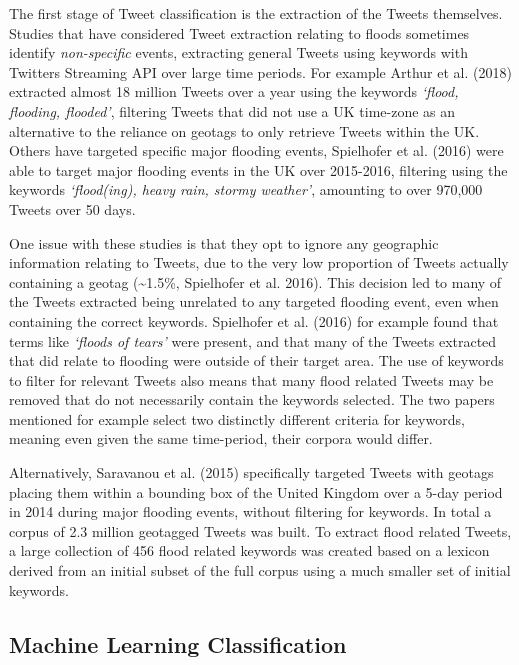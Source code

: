 \documentclass[a4paper, notitlepage]{extreport}
\begin{document}
The first stage of Tweet classification is the extraction of the Tweets
themselves. Studies that have considered Tweet extraction relating to
floods sometimes identify \emph{non-specific} events, extracting general
Tweets using keywords with Twitters Streaming API over large time
periods. For example Arthur et al. (2018) extracted almost 18 million
Tweets over a year using the keywords \emph{`flood, flooding, flooded'},
filtering Tweets that did not use a UK time-zone as an alternative to
the reliance on geotags to only retrieve Tweets within the UK. Others
have targeted specific major flooding events, Spielhofer et al. (2016)
were able to target major flooding events in the UK over 2015-2016,
filtering using the keywords \emph{`flood(ing), heavy rain, stormy
weather'}, amounting to over 970,000 Tweets over 50 days.

One issue with these studies is that they opt to ignore any geographic
information relating to Tweets, due to the very low proportion of Tweets
actually containing a geotag (\textasciitilde1.5\%, Spielhofer et al.
2016). This decision led to many of the Tweets extracted being unrelated
to any targeted flooding event, even when containing the correct
keywords. Spielhofer et al. (2016) for example found that terms like
\emph{`floods of tears'} were present, and that many of the Tweets
extracted that did relate to flooding were outside of their target area.
The use of keywords to filter for relevant Tweets also means that many
flood related Tweets may be removed that do not necessarily contain the
keywords selected. The two papers mentioned for example select two
distinctly different criteria for keywords, meaning even given the same
time-period, their corpora would differ.

Alternatively, Saravanou et al. (2015) specifically targeted Tweets with
geotags placing them within a bounding box of the United Kingdom over a
5-day period in 2014 during major flooding events, without filtering for
keywords. In total a corpus of 2.3 million geotagged Tweets was built.
To extract flood related Tweets, a large collection of 456 flood related
keywords was created based on a lexicon derived from an initial subset
of the full corpus using a much smaller set of initial keywords.

\hypertarget{machine-learning-classification}{%
\subsection{Machine Learning
Classification}\label{machine-learning-classification}}
\end{document}
